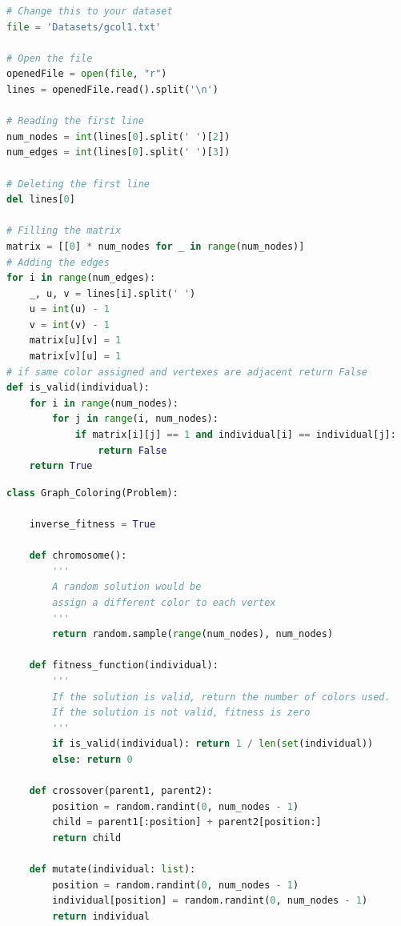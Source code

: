 \documentclass[12pt]{report} %
\begin{document}
\begin{changemargin}{-3cm}{-2cm}

	\begin{lstlisting}[language=python, caption= {Storing the dataset in a adjacency matrix graph}, captionpos=b]
# Change this to your dataset
file = 'Datasets/gcol1.txt'

# Open the file
openedFile = open(file, "r")
lines = openedFile.read().split('\n')

# Reading the first line
num_nodes = int(lines[0].split(' ')[2])
num_edges = int(lines[0].split(' ')[3])

# Deleting the first line
del lines[0]

# Filling the matrix
matrix = [[0] * num_nodes for _ in range(num_nodes)]
# Adding the edges
for i in range(num_edges):
    _, u, v = lines[i].split(' ')
    u = int(u) - 1
    v = int(v) - 1
    matrix[u][v] = 1
    matrix[v][u] = 1
# if same color assigned and vertexes are adjacent return False
def is_valid(individual): 
    for i in range(num_nodes):
        for j in range(i, num_nodes):
            if matrix[i][j] == 1 and individual[i] == individual[j]:
                return False
    return True
\end{lstlisting}
\end{changemargin}


\newpage

\begin{changemargin}{-3cm}{-2cm}

	\begin{lstlisting}[language=python, caption= {Graph Coloring class}, captionpos=b]
class Graph_Coloring(Problem):

    inverse_fitness = True

    def chromosome():
        '''
        A random solution would be 
        assign a different color to each vertex
        '''
        return random.sample(range(num_nodes), num_nodes)

    def fitness_function(individual):
        '''
        If the solution is valid, return the number of colors used.
        If the solution is not valid, fitness is zero
        '''
        if is_valid(individual): return 1 / len(set(individual))
        else: return 0

    def crossover(parent1, parent2):
        position = random.randint(0, num_nodes - 1)
        child = parent1[:position] + parent2[position:]
        return child

    def mutate(individual: list):
        position = random.randint(0, num_nodes - 1)
        individual[position] = random.randint(0, num_nodes - 1)
        return individual

\end{lstlisting}
\end{changemargin}
\end{document}
